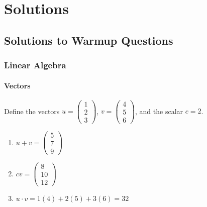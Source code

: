 \documentclass[
]{book}
\providecommand{\tightlist}{%
  \setlength{\itemsep}{0pt}\setlength{\parskip}{0pt}}
\theoremstyle{definition}
\theoremstyle{definition}
\theoremstyle{definition}
\theoremstyle{definition}
\theoremstyle{remark}
\begin{document}
\hypertarget{part-solutions}{%
\part{Solutions}\label{part-solutions}}

\hypertarget{solutions-to-warmup-questions}{%
\chapter*{Solutions to Warmup Questions}\label{solutions-to-warmup-questions}}

\hypertarget{linear-algebra-1}{%
\section*{Linear Algebra}\label{linear-algebra-1}}

\hypertarget{vectors-1}{%
\subsection*{Vectors}\label{vectors-1}}

Define the vectors \(u = \begin{pmatrix} 1 \\2 \\3 \end{pmatrix}\), \(v = \begin{pmatrix} 4\\5\\6 \end{pmatrix}\), and the scalar \(c = 2\).

\begin{enumerate}
\def\labelenumi{\arabic{enumi}.}
\tightlist
\item
  \(u + v = \begin{pmatrix}5\\7\\9\end{pmatrix}\)
\item
  \(cv = \begin{pmatrix}8\\10\\12\end{pmatrix}\)
\item
  \(u \cdot v = 1(4) + 2(5) + 3(6) = 32\)
\end{enumerate}
\end{document}
